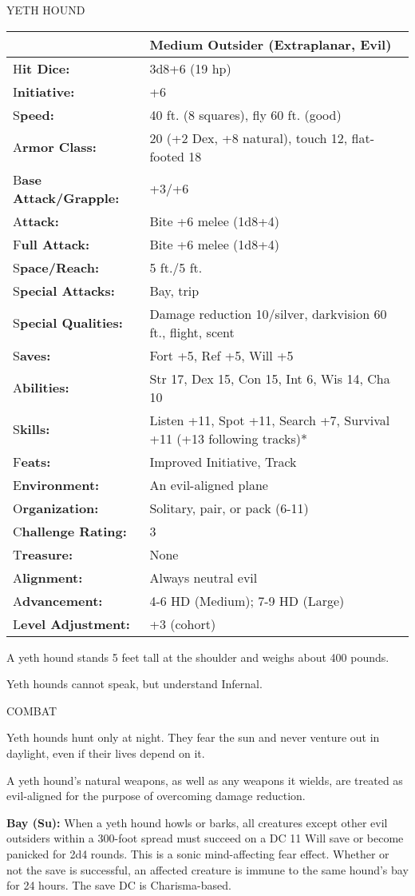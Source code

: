 \documentclass{article}
\begin{document}
\vspace{12pt}
{\LARGE{}YETH HOUND}

\begin{tabular}{|>{\raggedright}p{80pt}|>{\raggedright}p{245pt}|}
\hline
  & Medium Outsider (Extraplanar, Evil)\tabularnewline
\hline
H\textbf{it Dice:} & 3d8+6 (19 hp)\tabularnewline
\hline
I\textbf{nitiative:} & +6\tabularnewline
\hline
S\textbf{peed:} & 40 ft. (8 squares), fly 60 ft. (good)\tabularnewline
\hline
A\textbf{rmor Class:} & 20 (+2 Dex, +8 natural), touch 12, flat-footed 18\tabularnewline
\hline
B\textbf{ase Attack/Grapple:} & +3/+6\tabularnewline
\hline
A\textbf{ttack:} & Bite +6 melee (1d8+4)\tabularnewline
\hline
F\textbf{ull Attack:} & Bite +6 melee (1d8+4)\tabularnewline
\hline
S\textbf{pace/Reach:} & 5 ft./5 ft.\tabularnewline
\hline
S\textbf{pecial Attacks:} & Bay, trip\tabularnewline
\hline
S\textbf{pecial Qualities:} & Damage reduction 10/silver, darkvision 60 ft., flight, 
scent\tabularnewline
\hline
S\textbf{aves:} & Fort +5, Ref +5, Will +5\tabularnewline
\hline
A\textbf{bilities:} & Str 17, Dex 15, Con 15, Int 6, Wis 14, Cha 10\tabularnewline
\hline
S\textbf{kills:} & Listen +11, Spot +11, Search +7, Survival +11 (+13 following 
tracks)*\tabularnewline
\hline
F\textbf{eats:} & Improved Initiative, Track\tabularnewline
\hline
E\textbf{nvironment:} & An evil-aligned plane\tabularnewline
\hline
O\textbf{rganization:} & Solitary, pair, or pack (6-11)\tabularnewline
\hline
C\textbf{hallenge Rating:} & 3\tabularnewline
\hline
T\textbf{reasure:} & None\tabularnewline
\hline
A\textbf{lignment:} & Always neutral evil\tabularnewline
\hline
A\textbf{dvancement:} & 4-6 HD (Medium); 7-9 HD (Large)\tabularnewline
\hline
L\textbf{evel Adjustment:} & +3 (cohort)\tabularnewline
\hline
\end{tabular}

A yeth hound stands 5 feet tall at the shoulder and weighs about 400 pounds.

Yeth hounds cannot speak, but understand Infernal.

COMBAT

Yeth hounds hunt only at night. They fear the sun and never venture out in daylight, 
even if their lives depend on it. 

A yeth hound's natural weapons, as well as any weapons it wields, are treated as 
evil-aligned for the purpose of overcoming damage reduction.

\textbf{Bay (Su):} When a yeth hound howls or barks, all creatures except other 
evil outsiders within a 300-foot spread must succeed on a DC 11 Will save or become 
panicked for 2d4 rounds. This is a sonic mind-affecting fear effect. Whether or 
not the save is successful, an affected creature is immune to the same hound's 
bay for 24 hours. The save DC is Charisma-based.
\end{document}
